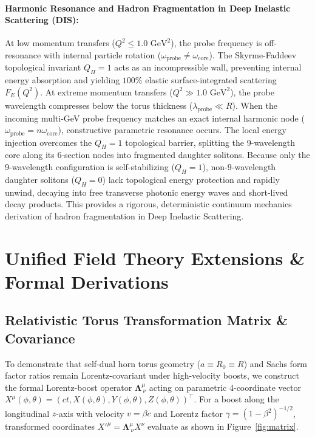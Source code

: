 \documentclass[11pt,a4paper]{article}
\begin{document}
	\paragraph{Harmonic Resonance and Hadron Fragmentation in Deep Inelastic Scattering (DIS):}
	At low momentum transfers ($Q^2 \le 1.0\text{ GeV}^2$), the probe frequency is off-resonance with internal particle rotation ($\omega_{\text{probe}} \neq \omega_{\text{core}}$). The Skyrme-Faddeev topological invariant $Q_H = 1$ acts as an incompressible wall, preventing internal energy absorption and yielding $100\%$ elastic surface-integrated scattering $F_E(Q^2)$. At extreme momentum transfers ($Q^2 \gg 1.0\text{ GeV}^2$), the probe wavelength compresses below the torus thickness ($\lambda_{\text{probe}} \ll R$). When the incoming multi-GeV probe frequency matches an exact internal harmonic node ($\omega_{\text{probe}} = n\omega_{\text{core}}$), constructive parametric resonance occurs. The local energy injection overcomes the $Q_H = 1$ topological barrier, splitting the 9-wavelength core along its 6-section nodes into fragmented daughter solitons. Because only the 9-wavelength configuration is self-stabilizing ($Q_H = 1$), non-9-wavelength daughter solitons ($Q_H = 0$) lack topological energy protection and rapidly unwind, decaying into free transverse photonic energy waves and short-lived decay products. This provides a rigorous, deterministic continuum mechanics derivation of hadron fragmentation in Deep Inelastic Scattering.
	
	\section{Unified Field Theory Extensions \& Formal Derivations}
	
	\subsection{Relativistic Torus Transformation Matrix \& Covariance}
	To demonstrate that self-dual horn torus geometry ($a \equiv R_0 \equiv R$) and Sachs form factor ratios remain Lorentz-covariant under high-velocity boosts, we construct the formal Lorentz-boost operator $\mathbf{\Lambda}^\mu_{\ \nu}$ acting on parametric 4-coordinate vector $X^\mu(\phi, \theta) = (ct, X(\phi, \theta), Y(\phi, \theta), Z(\phi, \theta))^\top$. For a boost along the longitudinal $z$-axis with velocity $v = \beta c$ and Lorentz factor $\gamma = (1 - \beta^2)^{-1/2}$, transformed coordinates $X'^\mu = \mathbf{\Lambda}^\mu_{\ \nu} X^\nu$ evaluate as shown in Figure~\ref{fig:matrix}.
	
\end{document}
